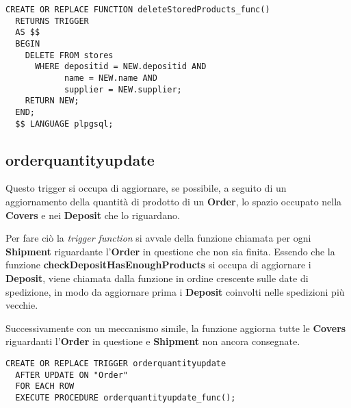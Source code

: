\begin{lstlisting}[caption={Funzione \textbf{deleteStoredProducts}}]
  CREATE OR REPLACE FUNCTION deleteStoredProducts_func()
  RETURNS TRIGGER
  AS $$
  BEGIN
    DELETE FROM stores
      WHERE depositid = NEW.depositid AND
            name = NEW.name AND
            supplier = NEW.supplier;
    RETURN NEW;
  END;
  $$ LANGUAGE plpgsql;
\end{lstlisting}

\subsection{\textbf{orderquantityupdate}}

Questo trigger si occupa di aggiornare, se possibile, a seguito di un aggiornamento della quantità di prodotto di un \textbf{Order}, lo spazio occupato nella \textbf{Covers} e nei \textbf{Deposit} che lo riguardano.

Per fare ciò la \textit{trigger function} si avvale della funzione  chiamata per ogni \textbf{Shipment} riguardante l'\textbf{Order} in questione che non sia finita. Essendo che la funzione \textbf{checkDepositHasEnoughProducts} si occupa di aggiornare i \textbf{Deposit}, viene chiamata dalla funzione in ordine crescente sulle date di spedizione, in modo da aggiornare prima i \textbf{Deposit} coinvolti nelle spedizioni più vecchie.

Successivamente con un meccanismo simile, la funzione aggiorna tutte le \textbf{Covers} riguardanti l'\textbf{Order} in questione e \textbf{Shipment} non ancora consegnate.

\begin{lstlisting}[caption={Trigger per implementare \textbf{orderquantityupdate}}]
  CREATE OR REPLACE TRIGGER orderquantityupdate
  AFTER UPDATE ON "Order"
  FOR EACH ROW
  EXECUTE PROCEDURE orderquantityupdate_func();
\end{lstlisting}

